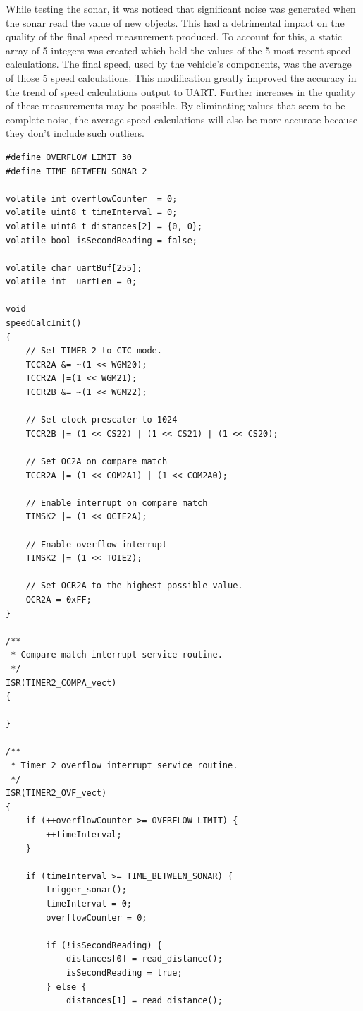 While testing the sonar, it was noticed that significant noise was generated when the sonar read the value of new objects. This had a detrimental impact on the quality of the final speed measurement produced. To account for this, a static array of 5 integers was created which held the values of the 5 most recent speed calculations. The final speed, used by the vehicle's components, was the average of those 5 speed calculations. This modification greatly improved the accuracy in the trend of speed calculations output to UART. Further increases in the quality of these measurements may be possible.  By eliminating values that seem to be complete noise, the average speed calculations will also be more accurate because they don't include such outliers.

\begin{lstlisting}
#define OVERFLOW_LIMIT 30
#define TIME_BETWEEN_SONAR 2

volatile int overflowCounter  = 0;
volatile uint8_t timeInterval = 0;
volatile uint8_t distances[2] = {0, 0};
volatile bool isSecondReading = false;

volatile char uartBuf[255];
volatile int  uartLen = 0;

void 
speedCalcInit()
{
    // Set TIMER 2 to CTC mode.
    TCCR2A &= ~(1 << WGM20);
    TCCR2A |=(1 << WGM21);
    TCCR2B &= ~(1 << WGM22);

    // Set clock prescaler to 1024
    TCCR2B |= (1 << CS22) | (1 << CS21) | (1 << CS20);

    // Set OC2A on compare match
    TCCR2A |= (1 << COM2A1) | (1 << COM2A0);

    // Enable interrupt on compare match
    TIMSK2 |= (1 << OCIE2A);

    // Enable overflow interrupt
    TIMSK2 |= (1 << TOIE2);

    // Set OCR2A to the highest possible value.
    OCR2A = 0xFF;
}

/**
 * Compare match interrupt service routine.
 */
ISR(TIMER2_COMPA_vect)
{

}

/**
 * Timer 2 overflow interrupt service routine.
 */
ISR(TIMER2_OVF_vect)
{
    if (++overflowCounter >= OVERFLOW_LIMIT) {
        ++timeInterval;
    }

    if (timeInterval >= TIME_BETWEEN_SONAR) {
        trigger_sonar();
        timeInterval = 0;
        overflowCounter = 0;

        if (!isSecondReading) {
            distances[0] = read_distance();
            isSecondReading = true;
        } else {
            distances[1] = read_distance();


\end{lstlisting}
